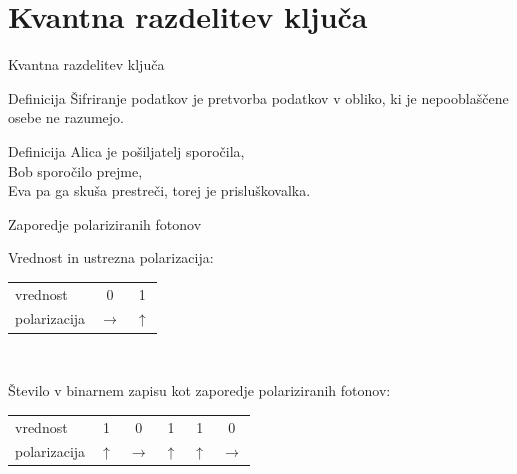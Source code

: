 \documentclass{beamer}
\begin{document}
\section{Kvantna razdelitev ključa}


\begin{frame}{Kvantna razdelitev ključa}

\begin{block}{Definicija}
Šifriranje podatkov je pretvorba podatkov v obliko, ki je nepooblaščene osebe ne razumejo.
\end{block}

\begin{block}{Definicija}
Alica je pošiljatelj sporočila,\\
Bob sporočilo prejme,\\
Eva pa ga skuša prestreči, torej je prisluškovalka.
\end{block}

\end{frame}


\begin{frame}{Zaporedje polariziranih fotonov}

Vrednost in ustrezna polarizacija:\\ \medskip
\begin{tabular}{l c c}
vrednost & 0 & 1\\
polarizacija & $\rightarrow$ & $\uparrow$\\
\end{tabular} \\

\bigskip

Število v binarnem zapisu kot zaporedje polariziranih fotonov:\\ \medskip
\begin{tabular}{l c c c c c}
vrednost & 1 & 0 & 1 & 1 & 0\\
polarizacija & $\uparrow$ &  $\rightarrow$ & $\uparrow$ & $\uparrow$ &  $\rightarrow$\\
\end{tabular}

\end{frame}

\end{document}
